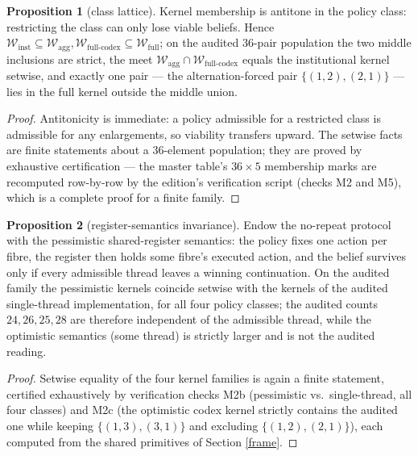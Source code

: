 \documentclass[10pt,twocolumn]{article}
\theoremstyle{definition}
\newtheorem{proposition}{Proposition}
\begin{document}
\begin{proposition}[class lattice]\label{prop:lattice}
Kernel membership is antitone in the policy class: restricting the class
can only lose viable beliefs. Hence
\(\mathcal{W}_{\mathrm{inst}} \subseteq \mathcal{W}_{\mathrm{agg}},
\mathcal{W}_{\mathrm{full\text{-}codex}} \subseteq
\mathcal{W}_{\mathrm{full}}\); on the audited 36-pair population the
two middle inclusions are strict, the meet
\(\mathcal{W}_{\mathrm{agg}} \cap
\mathcal{W}_{\mathrm{full\text{-}codex}}\) equals the institutional
kernel setwise, and exactly one pair --- the alternation-forced pair
\(\{(1,2),(2,1)\}\) --- lies in the full kernel outside the middle
union.
\end{proposition}

\begin{proof}
Antitonicity is immediate: a policy admissible for a restricted class is
admissible for any enlargements, so viability transfers upward. The
setwise facts are finite statements about a 36-element population; they
are proved by exhaustive certification --- the master table's
\(36 \times 5\) membership marks are recomputed row-by-row by the
edition's verification script (checks M2 and M5), which is a complete
proof for a finite family.
\end{proof}

\begin{proposition}[register-semantics invariance]\label{prop:register}
Endow the no-repeat protocol with the pessimistic shared-register
semantics: the policy fixes one action per fibre, the register then holds
some fibre's executed action, and the belief survives only if every
admissible thread leaves a winning continuation. On the audited family
the pessimistic kernels coincide setwise with the kernels of the audited
single-thread implementation, for all four policy classes; the audited
counts \(24, 26, 25, 28\) are therefore independent of the admissible
thread, while the optimistic semantics (some thread) is strictly larger
and is not the audited reading.
\end{proposition}

\begin{proof}
Setwise equality of the four kernel families is again a finite statement,
certified exhaustively by verification checks M2b (pessimistic vs.\
single-thread, all four classes) and M2c (the optimistic codex kernel
strictly contains the audited one while keeping \(\{(1,3),(3,1)\}\)
and excluding \(\{(1,2),(2,1)\}\)), each computed from the shared
primitives of Section \ref{frame}.
\end{proof}
\end{document}
